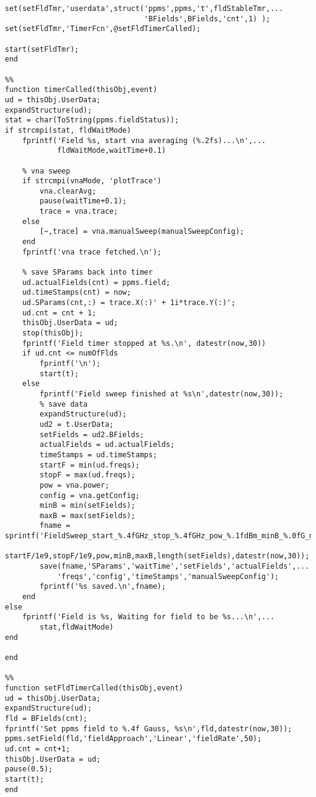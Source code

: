 \begin{lstlisting}
set(setFldTmr,'userdata',struct('ppms',ppms,'t',fldStableTmr,...
                                'BFields',BFields,'cnt',1) );
set(setFldTmr,'TimerFcn',@setFldTimerCalled);

start(setFldTmr);
end

%%
function timerCalled(thisObj,event)
ud = thisObj.UserData;
expandStructure(ud);
stat = char(ToString(ppms.fieldStatus));
if strcmpi(stat, fldWaitMode)
    fprintf('Field %s, start vna averaging (%.2fs)...\n',...
            fldWaitMode,waitTime+0.1)
    
    % vna sweep
    if strcmpi(vnaMode, 'plotTrace')
        vna.clearAvg;
        pause(waitTime+0.1);
        trace = vna.trace;
    else
        [~,trace] = vna.manualSweep(manualSweepConfig);
    end
    fprintf('vna trace fetched.\n');
    
    % save SParams back into timer
    ud.actualFields(cnt) = ppms.field;
    ud.timeStamps(cnt) = now;
    ud.SParams(cnt,:) = trace.X(:)' + 1i*trace.Y(:)';
    ud.cnt = cnt + 1;
    thisObj.UserData = ud;
    stop(thisObj);
    fprintf('Field timer stopped at %s.\n', datestr(now,30))
    if ud.cnt <= numOfFlds
        fprintf('\n');
        start(t);
    else
        fprintf('Field sweep finished at %s\n',datestr(now,30));
        % save data
        expandStructure(ud);
        ud2 = t.UserData;
        setFields = ud2.BFields;
        actualFields = ud.actualFields;
        timeStamps = ud.timeStamps;
        startF = min(ud.freqs);
        stopF = max(ud.freqs);
        pow = vna.power;
        config = vna.getConfig;
        minB = min(setFields);
        maxB = max(setFields);
        fname = sprintf('FieldSweep_start_%.4fGHz_stop_%.4fGHz_pow_%.1fdBm_minB_%.0fG_maxB_%.0fG_numB_%d_%s.mat',...
            startF/1e9,stopF/1e9,pow,minB,maxB,length(setFields),datestr(now,30));
        save(fname,'SParams','waitTime','setFields','actualFields',...
            'freqs','config','timeStamps','manualSweepConfig');
        fprintf('%s saved.\n',fname);
    end
else
    fprintf('Field is %s, Waiting for field to be %s...\n',...
        stat,fldWaitMode)
end

end

%%
function setFldTimerCalled(thisObj,event)
ud = thisObj.UserData;
expandStructure(ud);
fld = BFields(cnt);
fprintf('Set ppms field to %.4f Gauss, %s\n',fld,datestr(now,30));
ppms.setField(fld,'fieldApproach','Linear','fieldRate',50);
ud.cnt = cnt+1;
thisObj.UserData = ud;
pause(0.5);
start(t);
end
  \end{lstlisting}
  







